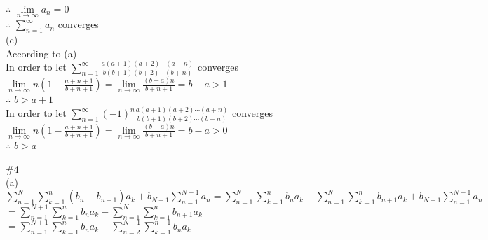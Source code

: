 \documentclass{article}
\begin{document}
$\therefore$ \qquad $\displaystyle \lim \limits_{n \to \infty} a_n = 0$\\

$\therefore$ \qquad $\displaystyle \sum \limits_{n=1}^\infty a_n$ \quad converges\\

(c)\\

According to (a)\\

In order to let $\displaystyle \sum \limits_{n=1}^\infty \frac{a(a+1)(a+2)\cdots(a+n)}{b(b+1)(b+2)\cdots(b+n)}$ converges\\

$\displaystyle \lim \limits_{n \to \infty} n \left(1 - \frac{a+n+1}{b+n+1}\right) = \lim \limits_{n \to \infty} \frac{(b-a)n}{b+n+1} = b-a > 1$\\

$\therefore$ \qquad $b>a+1$\\

In order to let $\displaystyle \sum \limits_{n=1}^\infty (-1)^n \frac{a(a+1)(a+2)\cdots(a+n)}{b(b+1)(b+2)\cdots(b+n)}$ converges\\

$\displaystyle \lim \limits_{n \to \infty} n \left(1 - \frac{a+n+1}{b+n+1}\right) = \lim \limits_{n \to \infty} \frac{(b-a)n}{b+n+1} = b-a > 0$\\

$\therefore$ \qquad $b>a$\\

\vskip 3cm

\textcolor[rgb]{0.00,0.00,0.50}{\#4}\\

(a)\\

$\displaystyle \sum \limits_{n=1}^N \sum \limits_{k=1}^n(b_n-b_{n+1})a_k + b_{N+1} \sum \limits_{n=1}^{N+1}a_n = \sum \limits_{n=1}^N \sum \limits_{k=1}^n b_na_k - \sum \limits_{n=1}^N \sum \limits_{k=1}^n b_{n+1}a_k + b_{N+1} \sum \limits_{n=1}^{N+1} a_n$\\

\hskip 5.6cm $\displaystyle = \sum \limits_{n=1}^{N+1} \sum \limits_{k=1}^n b_na_k - \sum \limits_{n=1}^N \sum \limits_{k=1}^n b_{n+1}a_k$\\

\hskip 5.6cm $\displaystyle = \sum \limits_{n=1}^{N+1} \sum \limits_{k=1}^n b_na_k - \sum \limits_{n=2}^{N+1} \sum \limits_{k=1}^{n-1} b_{n}a_k$\\
\end{document}
